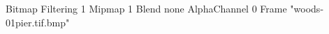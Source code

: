 {Bitmap
	{Filtering 1}
	{Mipmap 1}
	{Blend none}
	{AlphaChannel 0}
	{Frame "woods-01pier.tif.bmp"}
}
